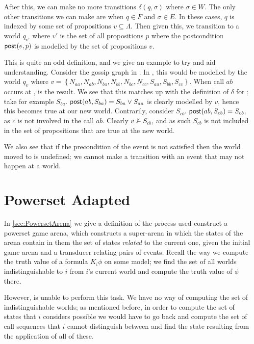 \documentclass[10pt, a4paper]{report}
\begin{document}
After this, we can make no more transitions $\delta(q, \sigma)$ where $\sigma
\in W$. The only other transitions we can make are when $q \in F$ and $\sigma
\in E$. In these cases, $q$ is indexed by some set of propositions $v \subseteq
\Lambda$. Then given this, we transition to a world $q_{v'}$ where $v'$ is the
set of all propositions $p$ where the postcondition $\textsf{post}(e, p)$ is modelled by
the set of propositions $v$. 

This is quite an odd definition, and we give an example to try and aid
understanding. Consider the gossip graph in . In
\mestar, this would be modelled by the world $q_v$ where $v = \left\{ N_{aa},
  N_{ab}, N_{ba}, N_{bb}, N_{bc}, N_{cc}, S_{aa}, S_{bb}, S_{cc} \right\}$. When
call $ab$ occurs at ,  is the
result. We see that this matches up with the definition of $\delta$ for \mestar;
take for example $S_{ba}$. $\textsf{post}(ab, S_{ba}) = S_{ba} \lor S_{aa}$ is clearly
modelled by $v$, hence this becomes true at our new world. Contrarily, consider
$S_{cb}$. $\textsf{post}(ab, S_{cb}) = S_{cb}$, as $c$ is not involved in the call $ab$.
Clearly $v \not \models S_{cb}$, and as such $S_{cb}$ is not included in the set
of propositions that are true at the new world.

We also see that if the precondition of the event is not satisfied then the
world moved to is undefined; we cannot make a transition with an event that may
not happen at a world. 

\bigskip 


\section{Powerset Adapted}
\label{sec:PowersetAdapted}

In \ref{sec:PowersetArena} we give a definition of the process used construct a
powerset game arena, which constructs a super-arena in which the states of the
arena contain in them the set of states \emph{related} to the current one, given
the initial game arena and a transducer relating pairs of events. Recall the way
we compute the truth value of a formula $K_i \phi$ on some model; we find the
set of all worlds indistinguishable to $i$ from $i$'s current world and compute
the truth value of $\phi$ there.

However, \mestar is unable to perform this task. We have no way of computing the
set of indistinguishable worlds; as mentioned before, in order to compute the set
of states that $i$ considers possible we would have to go back and compute the
set of call sequences that $i$ cannot distinguish between and find the state
resulting from the application of all of these. 
\end{document}
